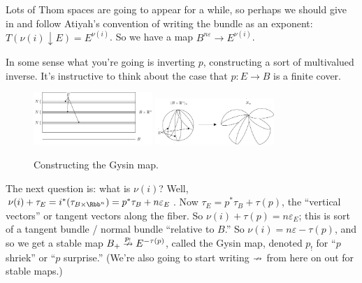 \begin{enumerate}
Lots of Thom spaces are going to appear for a while, so perhaps we should give in and follow Atiyah's convention of writing the bundle as an exponent: $T(\nu(i) \downarrow E) = E^{\nu(i)}$.  So we have a map $B^{n\varepsilon} \to E^{\nu(i)}$.

In some sense what you're going is inverting $p$, constructing a sort of multivalued inverse.  It's instructive to think about the case that $p: E \to B$ is a finite cover.
\begin{figure}[ht!]
\centering\includegraphics[width=0.4\textwidth]{figures/figure38-1.pdf}
\newline
\centering\includegraphics[width=0.4\textwidth]{figures/figure38-2.pdf}
\caption{\small Constructing the Gysin map.}
\end{figure}

The next question is: what is $\nu(i)$?  Well, $\nu(i) + \tau_E = i^*(\tau_{B \times \Rbb^n}) = p^* \tau_B + n\varepsilon_E$.  Now $\tau_E = p^* \tau_B + \tau(p)$, the ``vertical vectors'' or tangent vectors along the fiber.  So $\nu(i) + \tau(p) = n \varepsilon_E$; this is sort of a tangent bundle / normal bundle ``relative to $B$.''  So $\nu(i) = n \varepsilon - \tau(p)$, and so we get a stable map $B_+ \stackrel{p_!}{\nrightarrow} E^{-\tau(p)}$, called the Gysin map, denoted $p_!$ for ``$p$ shriek'' or ``$p$ surprise.''  (We're also going to start writing $\nrightarrow$ from here on out for stable maps.)


\end{enumerate}
